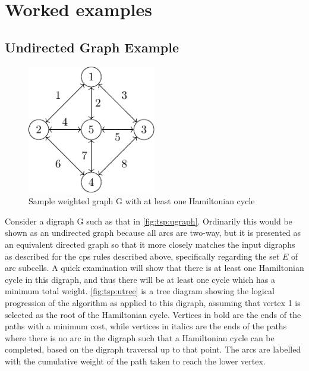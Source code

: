 \section{\label{sec:tsp:example}Worked examples}

\subsection{Undirected Graph Example}

\begin{figure}
\centering
\includegraphics[width=0.5\textwidth]{chapters/tsp/figs/ugraph-figure0}
\caption{\label{fig:tsp:ugraph}Sample weighted graph G with at least one Hamiltonian cycle}
\end{figure}

Consider a digraph G such as that in \autoref{fig:tsp:ugraph}.  Ordinarily this would be shown as an undirected graph because all arcs are two-way, but it is presented as an equivalent directed graph so that it more closely matches the input digraphs as described for the \gls{cps} rules described above, specifically regarding the set \(E\) of arc subcells.  A quick examination will show that there is at least one Hamiltonian cycle in this digraph, and thus there will be at least one cycle which has a minimum total weight.  \autoref{fig:tsp:utree} is a tree diagram showing the logical progression of the algorithm as applied to this digraph, assuming that vertex 1 is selected as the root of the Hamiltonian cycle.  Vertices in bold are the ends of the paths with a minimum cost, while vertices in italics are the ends of the paths where there is no arc in the digraph such that a Hamiltonian cycle can be completed, based on the digraph traversal up to that point.  The arcs are labelled with the cumulative weight of the path taken to reach the lower vertex.

